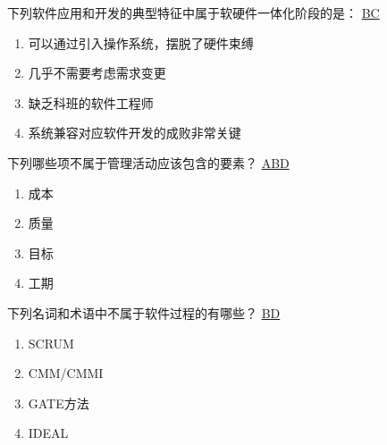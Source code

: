 \begin{problem}
	下列软件应用和开发的典型特征中属于软硬件一体化阶段的是：
	\uline{BC}    
    \vspace{-0.8em}
    \begin{multicols}{2}
        \begin{enumerate}[label=\Alph*.]
            \item 可以通过引入操作系统，摆脱了硬件束缚
            \item 几乎不需要考虑需求变更
            \item 缺乏科班的软件工程师
            \item 系统兼容对应软件开发的成败非常关键
        \end{enumerate}
    \end{multicols}
    \vspace{-1em}
\end{problem}




\begin{problem}
	下列哪些项不属于管理活动应该包含的要素？
	\uline{ABD}    
    \vspace{-0.8em}
    \begin{multicols}{4}
        \begin{enumerate}[label=\Alph*.]
            \item 成本
            \item 质量
            \item 目标
            \item 工期
        \end{enumerate}
    \end{multicols}
    \vspace{-1em}
\end{problem}



\begin{problem}
	下列名词和术语中不属于软件过程的有哪些？
	\uline{BD}    
    \vspace{-0.8em}
    \begin{multicols}{4}
        \begin{enumerate}[label=\Alph*.]
            \item SCRUM
            \item CMM/CMMI
            \item GATE方法
            \item IDEAL
        \end{enumerate}
    \end{multicols}
    \vspace{-1em}
\end{problem}




